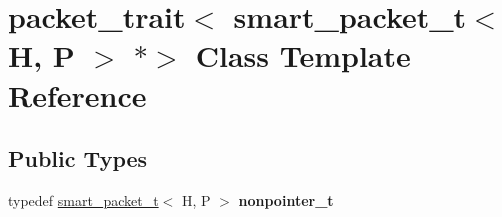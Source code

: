 \hypertarget{classpacket__trait_3_01smart__packet__t_3_01H_00_01P_01_4_01_5_4}{}\section{packet\+\_\+trait$<$ smart\+\_\+packet\+\_\+t$<$ H, P $>$ $\ast$$>$ Class Template Reference}
\label{classpacket__trait_3_01smart__packet__t_3_01H_00_01P_01_4_01_5_4}
\subsection*{Public Types}
\begin{DoxyCompactItemize}
\item 
\mbox{\label{classpacket__trait_3_01smart__packet__t_3_01H_00_01P_01_4_01_5_4_aac93eb167db60faabdb02f05c12ca083}} 
typedef \hyperlink{classsmart__packet__t}{smart\+\_\+packet\+\_\+t}$<$ H, P $>$ {\bfseries nonpointer\+\_\+t}
\end{DoxyCompactItemize}
